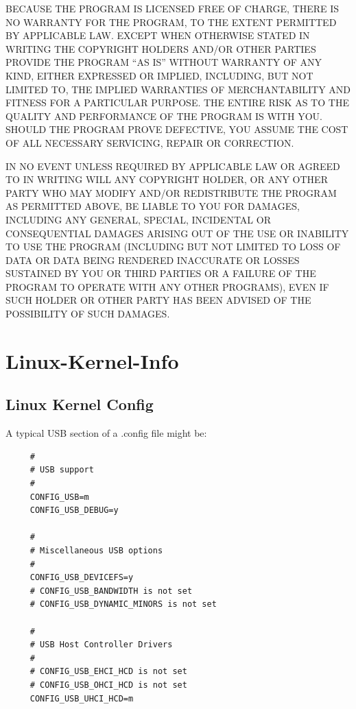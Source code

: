 {{{{{{{{{{{{\label{index-Disclaimer-264}
BECAUSE THE PROGRAM IS LICENSED FREE OF CHARGE, THERE IS NO WARRANTY FOR THE
PROGRAM, TO THE EXTENT PERMITTED BY APPLICABLE LAW. EXCEPT WHEN OTHERWISE
STATED IN WRITING THE COPYRIGHT HOLDERS AND/OR OTHER PARTIES PROVIDE THE
PROGRAM ``AS IS'' WITHOUT WARRANTY OF ANY KIND, EITHER EXPRESSED OR IMPLIED,
INCLUDING, BUT NOT LIMITED TO, THE IMPLIED WARRANTIES OF MERCHANTABILITY AND
FITNESS FOR A PARTICULAR PURPOSE. THE ENTIRE RISK AS TO THE QUALITY AND
PERFORMANCE OF THE PROGRAM IS WITH YOU. SHOULD THE PROGRAM PROVE DEFECTIVE,
YOU ASSUME THE COST OF ALL NECESSARY SERVICING, REPAIR OR CORRECTION.  

IN NO EVENT UNLESS REQUIRED BY APPLICABLE LAW OR AGREED TO IN WRITING WILL ANY
COPYRIGHT HOLDER, OR ANY OTHER PARTY WHO MAY MODIFY AND/OR REDISTRIBUTE THE
PROGRAM AS PERMITTED ABOVE, BE LIABLE TO YOU FOR DAMAGES, INCLUDING ANY
GENERAL, SPECIAL, INCIDENTAL OR CONSEQUENTIAL DAMAGES ARISING OUT OF THE USE
OR INABILITY TO USE THE PROGRAM (INCLUDING BUT NOT LIMITED TO LOSS OF DATA OR
DATA BEING RENDERED INACCURATE OR LOSSES SUSTAINED BY YOU OR THIRD PARTIES OR
A FAILURE OF THE PROGRAM TO OPERATE WITH ANY OTHER PROGRAMS), EVEN IF SUCH
HOLDER OR OTHER PARTY HAS BEEN ADVISED OF THE POSSIBILITY OF SUCH DAMAGES. 

\label{Linux-Kernel-Info}
\section*{Linux-Kernel-Info}

\subsection*{Linux Kernel Config}
\label{Linux-Kernel-Config}

A typical USB section of a .config file might be:  

\label{index-Kernel-config-265}
\label{index-config_002c-Kernel-266}

\footnotesize
\begin{verbatim}
     #
     # USB support
     #
     CONFIG_USB=m
     CONFIG_USB_DEBUG=y
     
     #
     # Miscellaneous USB options
     #
     CONFIG_USB_DEVICEFS=y
     # CONFIG_USB_BANDWIDTH is not set
     # CONFIG_USB_DYNAMIC_MINORS is not set
     
     #
     # USB Host Controller Drivers
     #
     # CONFIG_USB_EHCI_HCD is not set
     # CONFIG_USB_OHCI_HCD is not set
     CONFIG_USB_UHCI_HCD=m
     

\end{verbatim}}}}}}}}}}}}}
